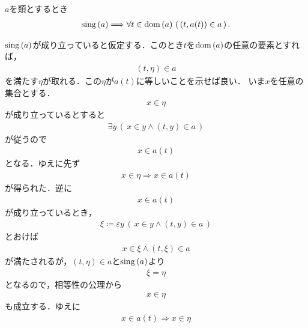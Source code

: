 	
	\begin{screen}
		\begin{thm}[値とは要素となる順序対の片割れである]\label{thm:value_and_ordered_pair}
			$a$を類とするとき
			\begin{align}
				\operatorname*{sing} \left(a\right) \Longrightarrow \forall t \in \operatorname*{dom} \left(a\right)\, \left(\, (t,a(t)) \in a\, \right).
			\end{align}
		\end{thm}
	\end{screen}
	
	\begin{sketch}
		$\operatorname*{sing} \left(a\right)$が成り立っていると仮定する．このとき$t$を$\operatorname*{dom} \left(a\right)$の任意の要素とすれば，
		\begin{align}
			(t,\eta) \in a
		\end{align}
		を満たす$\eta$が取れる．この$\eta$が$a(t)$に等しいことを示せば良い．
		いま$x$を任意の集合とする．
		\begin{align}
			x \in \eta
		\end{align}
		が成り立っているとすると
		\begin{align}
			\exists y\, (\, x \in y \wedge (t,y) \in a\, )
		\end{align}
		が従うので
		\begin{align}
			x \in a(t)
		\end{align}
		となる．ゆえに先ず
		\begin{align}
			x \in \eta \Longrightarrow x \in a(t)
		\end{align}
		が得られた．逆に
		\begin{align}
			x \in a(t)
		\end{align}
		が成り立っているとき，
		\begin{align}
			\xi \coloneqq \varepsilon y\, (\, x \in y \wedge (t,y) \in a\, )
		\end{align}
		とおけば
		\begin{align}
			x \in \xi \wedge (t,\xi) \in a
		\end{align}
		が満たされるが，$(t,\eta) \in a$と$\operatorname*{sing} \left(a\right)$より
		\begin{align}
			\xi = \eta
		\end{align}
		となるので，相等性の公理から
		\begin{align}
			x \in \eta
		\end{align}
		も成立する．ゆえに
		\begin{align}
			x \in a(t) \Longrightarrow x \in \eta

\end{align}
\end{sketch}
